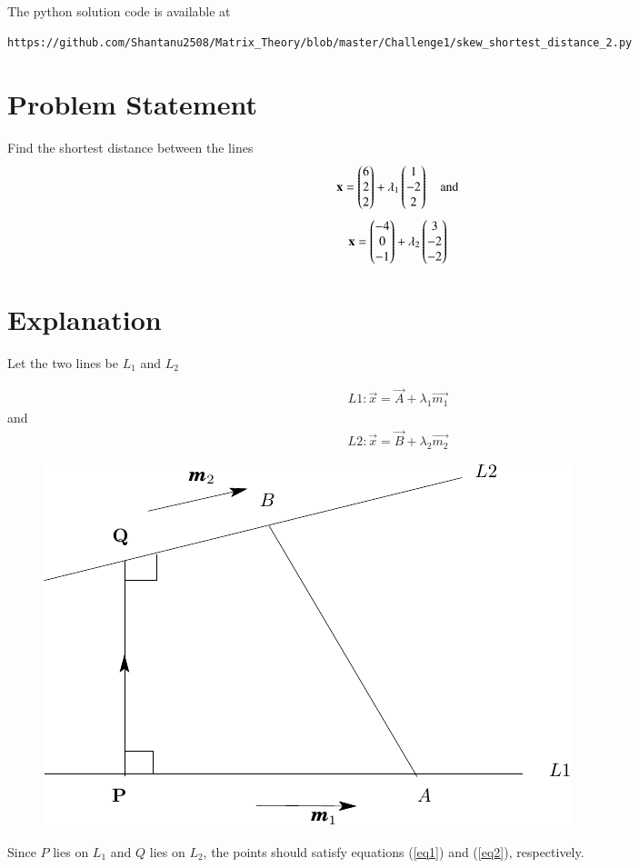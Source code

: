 \documentclass[journal,12pt,twocolumn]{IEEEtran}
\begin{document}
The python solution code is available at
\begin{lstlisting}
https://github.com/Shantanu2508/Matrix_Theory/blob/master/Challenge1/skew_shortest_distance_2.py
\end{lstlisting}
\section{Problem Statement}
Find the shortest distance between the lines
\begin{equation*}
	\mathbf{x} = \begin{pmatrix}6\\2\\2\end{pmatrix} + \lambda_1 \begin{pmatrix}1\\-2\\2\end{pmatrix} \quad \text{and} 
\end{equation*}
\begin{equation*}
	 \mathbf{x} = \begin{pmatrix}-4\\0\\-1\end{pmatrix} + \lambda_2 \begin{pmatrix}3\\-2\\-2\end{pmatrix}
\end{equation*}
\section{Explanation}
	Let the two lines be $L_1$ and $L_2$

\begin{align}
	L1 : \vec{x} = \vec{A} + \lambda_1\vec{m_1}
	\label{eq1}
\end{align}
and
\begin{align}
        L2 : \vec{x} = \vec{B} + \lambda_2\vec{m_2}
        \label{eq2}
\end{align}

\begin{figure}[htbp]
\includegraphics[width=\columnwidth]{skewlines.pdf}
	\caption{} \label{linefig1}
\end{figure}
\noindent
Since $P$ lies on $L_1$ and $Q$ lies on $L_2$, the points should satisfy 
	equations (\ref{eq1}) and (\ref{eq2}), respectively.
\end{document}
